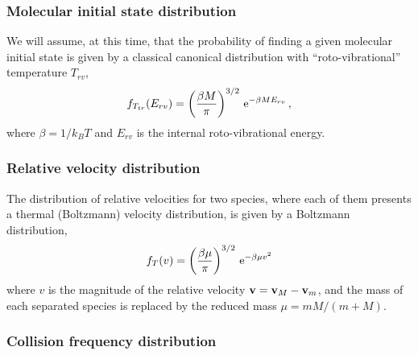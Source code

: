 \subsubsection{Molecular initial state distribution}

We will assume, at this time, that the probability of finding a given molecular initial state is given by a classical canonical distribution with ``roto-vibrational'' temperature $T_{rv}$,
\begin{equation}
  \label{Q:rates-rotovib-distrib}
  f_{T_{tr}}(E_{rv}) = \left( \frac{\beta M}{\pi} \right)^{3/2} \, \mathrm{e}^{- \beta M E_{rv}} \,,
\end{equation}
where $\beta= 1/k_{B}T$ and $E_{rv}$ is the internal roto-vibrational energy.

\subsubsection{Relative velocity distribution}

The distribution of relative velocities for two species, where each of them presents a thermal (Boltzmann) velocity distribution, is given by a Boltzmann distribution,
\begin{equation}
  \label{Q:rates-relat-veloc-distrib}
  f_{T}(v) = \left( \frac{\beta \mu}{\pi} \right)^{3/2} \, \mathrm{e}^{- \beta \mu v^{2}}
\end{equation}
where $v$ is the magnitude of the relative velocity $\mathbf{v} = \mathbf{v}_{M}- \mathbf{v}_{m}$, and the mass of each separated species is replaced by the reduced mass $\mu = m M /(m + M)$.



\subsubsection{Collision frequency distribution}

